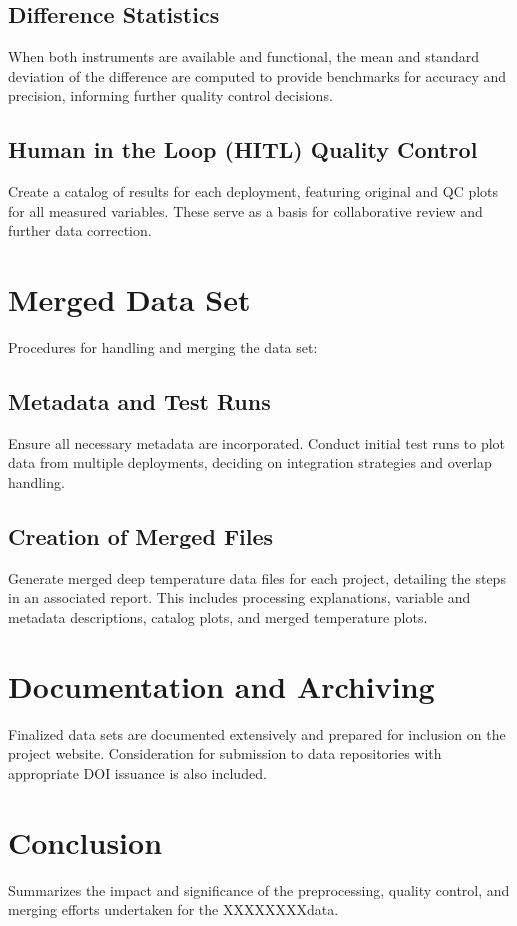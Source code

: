 \documentclass[11pt]{article}
\newcommand{\projectname}{XXXXXX}  %
\newcommand{\caseNumber}{XX}
\begin{document}
\subsection{Difference Statistics}
When both instruments are available and functional, 
the mean and standard deviation of the difference are computed to provide benchmarks for accuracy and precision, 
informing further quality control decisions.

\subsection{Human in the Loop (HITL) Quality Control}
Create a catalog of results for each deployment, featuring original and QC plots for all measured variables. 
These serve as a basis for collaborative review and further data correction.

\section{Merged Data Set}
Procedures for handling and merging the data set:

\subsection{Metadata and Test Runs}
Ensure all necessary metadata are incorporated. Conduct initial test runs to plot data from multiple deployments, 
deciding on integration strategies and overlap handling.

\subsection{Creation of Merged Files}
Generate merged deep temperature data files for each project, detailing the steps in an associated report. 
This includes processing explanations, variable and metadata descriptions, catalog plots, and merged temperature plots.

\section{Documentation and Archiving}
Finalized data sets are documented extensively and prepared for inclusion on the project website. 
Consideration for submission to data repositories with appropriate DOI issuance is also included.

\section{Conclusion}
Summarizes the impact and significance of the preprocessing, quality control, and merging efforts undertaken for the \projectname\caseNumber data.
\end{document}
